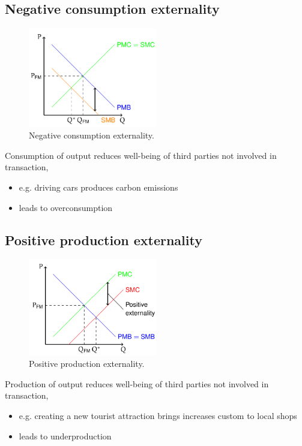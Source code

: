 \documentclass[class=report, crop=false, 12pt,a4paper]{standalone}
\begin{document}
\subsection{Negative consumption externality}
\begin{figure}[H]
	\centering
	\includegraphics[width = 0.5\textwidth]{../img/figure17.png}
	\caption{Negative consumption externality.}
\end{figure}
Consumption of output reduces well-being of third parties not involved in transaction,
\begin{itemize}
	\item e.g. driving cars produces carbon emissions
	\item leads to overconsumption
\end{itemize}
\subsection{Positive production externality}
\begin{figure}[H]
	\centering
	\includegraphics[width = 0.5\textwidth]{../img/figure18.png}
	\caption{Positive production externality.}
\end{figure}
Production of output reduces well-being of third parties not involved in transaction,
\begin{itemize}
	\item e.g. creating a new tourist attraction brings increases custom to local shops
	\item leads to underproduction
\end{itemize}
\end{document}
